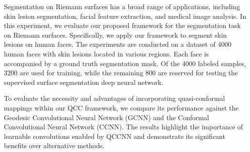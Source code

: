 Segmentation on Riemann surfaces has a broad range of applications, including skin lesion segmentation, facial feature extraction, and medical image analysis. In this experiment, we evaluate our proposed framework for the segmentation task on Riemann surfaces. Specifically, we apply our framework to segment skin lesions on human faces. The experiments are conducted on a dataset of 4000 human faces with skin lesions located in various regions. Each face is accompanied by a ground truth segmentation mask. Of the 4000 labeled samples, 3200 are used for training, while the remaining 800 are reserved for testing the supervised surface segmentation deep neural network. 

To evaluate the necessity and advantages of incorporating quasi-conformal mappings within our QCC framework, we compare its performance against the Geodesic Convolutional Neural Network (GCNN) and the Conformal Convolutional Neural Network (CCNN). The results highlight the importance of learnable convolutions enabled by QCCNN and demonstrate its significant benefits over alternative methods.


